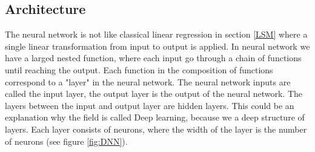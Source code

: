 \subsection{Architecture}
The neural network is not like classical linear regression in section \ref{LSM} where a single linear transformation from input to output is applied. In neural network we have a larged nested function, where each input go through a chain of functions until reaching the output. Each function in the composition of functions correspond to a "layer" in the neural network. The neural network inputs are called the input layer, the output layer is the output of the neural network. The layers between the input and output layer are hidden layers. This could be an explanation why the field is called Deep learning, because we a deep structure of layers. Each layer consists of neurons, where the width of the layer is the number of neurons (see figure \ref{fig:DNN}).

